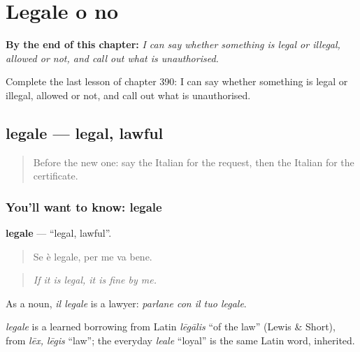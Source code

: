 
\chapter{Legale o no}
\label{ch:it-legale-o-no}

\begin{chapteropening}
\textbf{By the end of this chapter:} \emph{I can say whether something is legal or illegal, allowed or not, and call out what is unauthorised.}

Complete the last lesson of chapter 390: I can say whether something is legal or illegal, allowed or not, and call out what is unauthorised.
\end{chapteropening}

\section[legale]{legale — legal, lawful}

\label{lesson:IT-C390-legale}



\begin{quote}
Before the new one: say the Italian for the request, then the Italian for the certificate.
\end{quote}

\subsection*{You'll want to know: legale}
\textbf{legale} — \textquotedblleft{}legal, lawful\textquotedblright{}.

\begin{quote}
Se è legale, per me va bene.
\end{quote}

\begin{quote}
\emph{If it is legal, it is fine by me.}
\end{quote}

As a noun, \emph{il legale} is a lawyer: \emph{parlane con il tuo legale}.

\begin{cousinweb}
\emph{legale} is a learned borrowing from Latin \emph{lēgālis} \textquotedblleft{}of the law\textquotedblright{} (Lewis \& Short), from \emph{lēx, lēgis} \textquotedblleft{}law\textquotedblright{}; the everyday \emph{leale} \textquotedblleft{}loyal\textquotedblright{} is the same Latin word, inherited.
\end{cousinweb}

